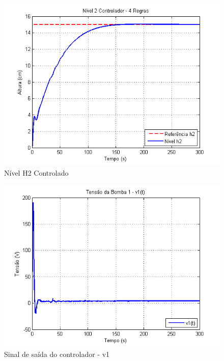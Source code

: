 \begin{figure}[H]
	\centering
	\includegraphics[height=0.35\paperheight, keepaspectratio]{img/nm_ctrl_h2ts2_free.png}
	\caption{Nível H2 Controlado }
	\label{figH2CtrlTS2_free_nm}
\end{figure}

\begin{figure}[H]
	\centering
	\includegraphics[height=0.35\paperheight, keepaspectratio]{img/nm_u1_free.png}
	\caption{\small Sinal de saída do controlador - v1 }
	\label{figNm_u1_free}
\end{figure}

